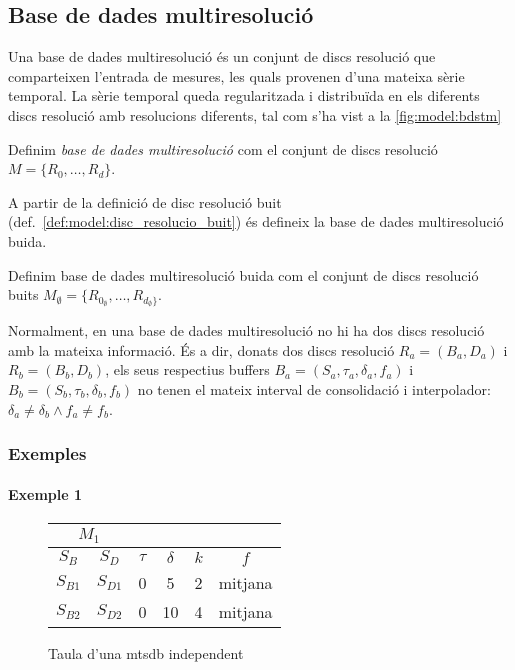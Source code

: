 \subsection{Base de dades multiresolució}\label{sec:model:bdstm}

Una base de dades multiresolució és un conjunt de discs resolució que comparteixen l'entrada de mesures, les quals provenen d'una mateixa sèrie temporal. La sèrie temporal queda regularitzada i distribuïda  en els diferents discs resolució amb resolucions diferents, tal com s'ha vist a la \autoref{fig:model:bdstm}


\begin{definition}
  Definim \emph{base de dades multiresolució} com el conjunt de discs resolució
  $M=\{R_0,\dotsc,R_d\}$.
\end{definition}

A partir de la definició de disc resolució buit (def.~\ref{def:model:disc_resolucio_buit}) és defineix la base de dades multiresolució buida. 
 
\begin{definition}\label{def:model:bd_multiresolucio_buit}
  Definim base de dades multiresolució buida com el conjunt de discs
  resolució buits
  $M_{\emptyset}=\{R_{0_{\emptyset}},\dotsc,R_{d_{\emptyset}\}}$.
\end{definition}

Normalment, en una base de dades multiresolució no hi ha dos discs
resolució amb la mateixa informació. És a dir, donats dos discs
resolució $R_a = (B_a, D_a)$ i $R_b = (B_b, D_b)$, 
els seus respectius buffers 
$B_a=(S_a,\tau_a,\delta_a,f_a)$ i
$B_b=(S_b,\tau_b,\delta_b,f_b)$ no tenen el mateix interval de
consolidació i interpolador: 
$\delta_a \neq \delta_b \wedge f_a \neq f_b$.









\subsubsection{Exemples}

\paragraph{Exemple 1}

\begin{figure}[tp]
  \centering
  \begin{tabular}{|c|c|c|c|c|c|}
    \multicolumn{2}{c}{$M_1$} \\ \hline
    $S_B$  & $S_D$ & $\tau$ & $\delta$ & $k$ & $f$ \\ \hline
    $S_{B1}$ & $S_{D1}$ & 0 & 5  & 2 & mitjana  \\
    $S_{B2}$ & $S_{D2}$ & 0 & 10 & 4 & mitjana  \\ \hline
  \end{tabular}
  \caption{Taula d'una mtsdb independent}
  \label{fig:model:mtsdb:independent}
\end{figure}



